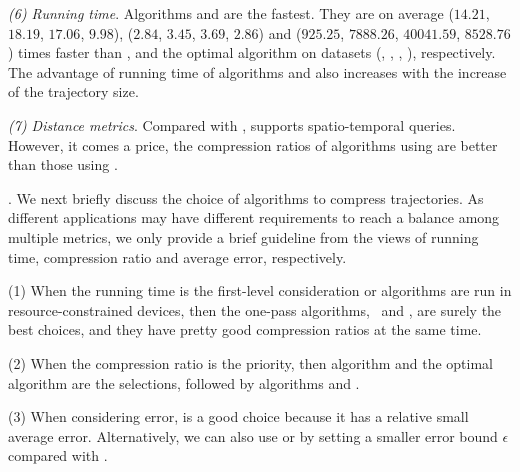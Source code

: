 {\sstab\emph{(6) Running time}. Algorithms \cist and \cista are the fastest. They are on average
($14.21$, $18.19$, $17.06$, $9.98$), ($2.84$, $3.45$, $3.69$, $2.86$) and ($925.25$, $7888.26$, $40041.59$, $8528.76$) times faster than \dps, \squishe and the optimal \lsa algorithm on datasets (\sercar, \geolife, \mopsi, \pricar), respectively.
The advantage of running time of algorithms \cist and \cista also increases  with the increase of the trajectory size.


\sstab \emph{(7) Distance metrics}. Compared with \ped, \sed supports  spatio-temporal queries. However, it comes a price, \eg  the compression ratios of algorithms using \ped are better than those using \sed.}


. We next briefly discuss the choice of algorithms to compress trajectories.
As different applications may have different requirements to reach a balance among multiple metrics, we only provide a brief guideline from the views of running time, compression ratio and average error, respectively.

\sstab(1) When the running time is the first-level consideration or algorithms are run in resource-constrained devices, then the one-pass algorithms, \ie~\cist and \cista, are surely the best choices, and they have pretty good compression ratios at the same time.

\sstab(2) When the compression ratio is the priority, then algorithm \cista and the optimal algorithm are the selections, followed by algorithms \dps and \cist.

\sstab(3) When considering error, \squishe is a good choice because it has a relative small average error. Alternatively, we can also use \dps or \cist by setting a smaller error bound $\epsilon$ compared with \squishe.





